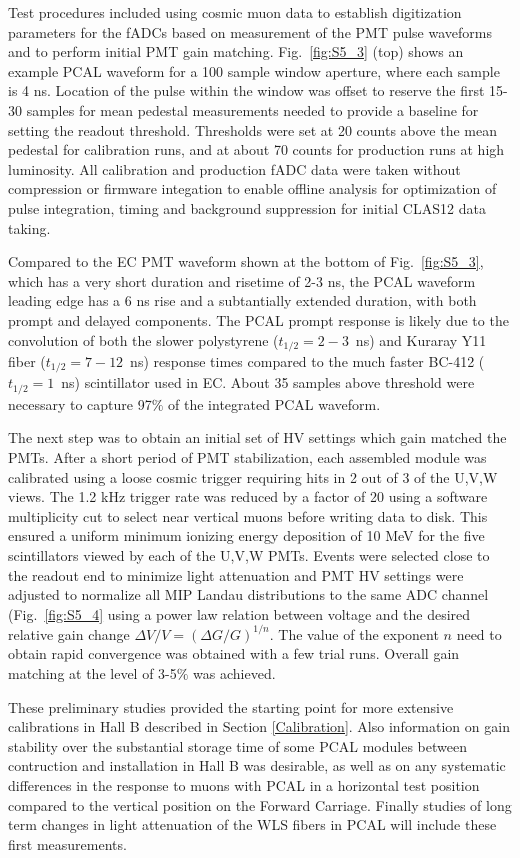 Test procedures included using cosmic muon data to establish digitization parameters for the fADCs based on measurement of the PMT pulse waveforms and to perform initial PMT gain matching.  Fig.~\ref{fig:S5_3} (top) shows an example PCAL waveform for a 100 sample window aperture, where each sample is 4 ns.  Location of the pulse within the window was offset to reserve the first 15-30 samples for mean pedestal measurements needed to provide a baseline for setting the readout threshold.  Thresholds were set at 20 counts above the mean pedestal for calibration runs, and at about 70 counts for production runs at high luminosity.  All calibration and production fADC data were taken without compression or firmware integation to enable offline analysis for optimization of pulse integration, timing and background suppression for initial CLAS12 data taking.

Compared to the EC PMT waveform shown at the bottom of Fig.~\ref{fig:S5_3}, which has a very short duration and risetime of 2-3 ns, the PCAL waveform leading edge has a 6 ns rise and a subtantially extended duration, with both prompt and delayed components.  The PCAL prompt response is likely due to the convolution of both the slower polystyrene ($t_{1/2}=2-3$~ns) and Kuraray Y11 fiber ($t_{1/2}=7-12$~ns) response times compared to the much faster BC-412 ($t_{1/2}=1$~ns) scintillator used in EC.  About 35 samples above threshold were necessary to capture 97$\%$ of the integrated PCAL waveform.  

The next step was to obtain an initial set of HV settings which gain matched the PMTs.  After a short period of PMT stabilization, each assembled module was calibrated using a loose cosmic trigger requiring hits in 2 out of 3 of the U,V,W views.  The 1.2 kHz trigger rate was reduced by a factor of 20 using a software multiplicity cut to select near vertical muons before writing data to disk.  This ensured a uniform minimum ionizing energy deposition of 10 MeV for the five scintillators viewed by each of the U,V,W PMTs. Events were selected close to the readout end to minimize light attenuation and PMT HV settings were adjusted to normalize all MIP Landau distributions to the same ADC channel (Fig.~\ref{fig:S5_4} using a power law relation between voltage and the desired relative gain change $\Delta V/V = (\Delta G/G)^{1/n}$.  The value of the exponent $n$ need to obtain rapid convergence was obtained with a few trial runs.  Overall gain matching at the level of 3-5$\%$ was achieved.

These preliminary studies provided the starting point for more extensive calibrations in Hall B described in Section \ref{Calibration}.  Also information on gain stability over the substantial storage time of some PCAL modules between contruction and installation in Hall B was desirable, as well as on any systematic differences in the response to muons with PCAL in a horizontal test position compared to the vertical position on the Forward Carriage.  Finally studies of long term changes in light attenuation of the WLS fibers in PCAL will include these first measurements.

